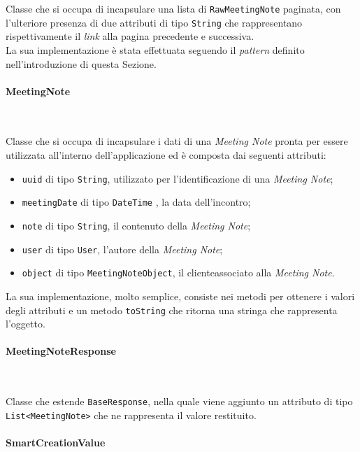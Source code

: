\noindent Classe che si occupa di incapsulare una lista di \lstinline{RawMeetingNote} paginata, con l'ulteriore presenza di due attributi di tipo \lstinline{String} che rappresentano rispettivamente il \emph{link} alla pagina precedente e successiva.\\
La sua implementazione è stata effettuata seguendo il \emph{pattern} definito nell'introduzione di questa Sezione.

\paragraph*{MeetingNote} ~ \\
\label{par:meeting-note}

\noindent Classe che si occupa di incapsulare i dati di una \emph{Meeting Note} pronta per essere utilizzata all'interno dell'applicazione ed è composta dai seguenti attributi:
\begin{itemize}
    \item \lstinline{uuid} di tipo \lstinline{String}, utilizzato per l'identificazione di una \emph{Meeting Note};
    \item \lstinline{meetingDate} di tipo \lstinline{DateTime} \cite{site:date-time}, la data dell'incontro;
    \item \lstinline{note} di tipo \lstinline{String}, il contenuto della \emph{Meeting Note};
    \item \lstinline{user} di tipo \lstinline{User}, l'autore della \emph{Meeting Note};
    \item \lstinline{object} di tipo \lstinline{MeetingNoteObject}, il \gls{cliente}\glsoccur associato alla \emph{Meeting Note}.
\end{itemize}
La sua implementazione, molto semplice, consiste nei metodi per ottenere i valori degli attributi e un metodo \lstinline{toString} che ritorna una stringa che rappresenta l'oggetto.

\paragraph*{MeetingNoteResponse} ~ \\
\label{par:meeting-note-response}

\noindent Classe che estende \lstinline{BaseResponse}, nella quale viene aggiunto un attributo di tipo \lstinline{List<MeetingNote>} che ne rappresenta il valore restituito.

\paragraph*{SmartCreationValue} ~ \\
\label{par:smart-creation-value}

